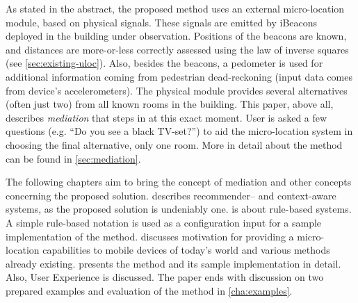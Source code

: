 As stated in the abstract, the proposed method uses an external micro-location module, based on physical signals. These signals are emitted by iBeacons deployed in the building under observation. Positions of the beacons are known, and distances are more-or-less correctly assessed using the law of inverse squares (see \cref{sec:existing-uloc}). Also, besides the beacons, a pedometer is used for additional information coming from pedestrian dead-reckoning (input data comes from device's accelerometers). The physical module provides several alternatives (often just two) from all known rooms in the building. This paper, above all, describes \emph{mediation} that steps in at this exact moment. User is asked a few questions (e.g. ``Do you see a black TV-set?'') to aid the micro-location system in choosing the final alternative, only one room. More in detail about the method can be found in \cref{sec:mediation}.


The following chapters aim to bring the concept of mediation and other concepts concerning the proposed solution.  describes recommender-- and context-aware systems, as the proposed solution is undeniably one.  is about rule-based systems. A simple rule-based notation is used as a configuration input for a sample implementation of the method.  discusses motivation for providing a micro-location capabilities to mobile devices of today's world and various methods already existing.  presents the method and its sample implementation in detail. Also, User Experience is discussed. The paper ends with discussion on two prepared examples and evaluation of the method in \cref{cha:examples}. %
